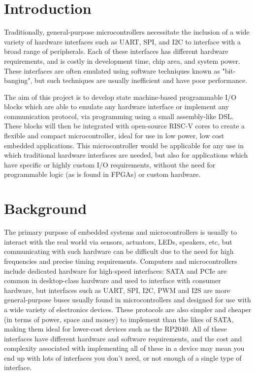 \documentclass[a4paper,fleqn,12pt]{article}
\begin{document}


\pagestyle{plain}

\section{Introduction}
Traditionally, general-purpose microcontrollers necessitate the inclusion of a wide variety of hardware interfaces such as UART, SPI, and I2C to interface with a broad range of peripherals. Each of these interfaces has different hardware requirements, and is costly in development time, chip area, and system power. These interfaces are often emulated using software techniques known as "bit-banging", but such techniques are usually inefficient and have poor performance.

The aim of this project is to develop state machine-based programmable I/O blocks which are able to emulate any hardware interface or implement any communication protocol, via programming using a small assembly-like DSL. These blocks will then be integrated with open-source RISC-V cores to create a flexible and compact microcontroller, ideal for use in low power, low cost embedded applications. This microcontroller would be applicable for any use in which traditional hardware interfaces are needed, but also for applications which have specific or highly custom I/O requirements, without the need for programmable logic (as is found in FPGAs) or custom hardware.

\section{Background}

The primary purpose of embedded systems and microcontrollers is usually to interact with the real world via sensors, actuators, LEDs, speakers, etc, but communicating with such hardware can be difficult due to the need for high frequencies and precise timing requirements. Computers and microcontrollers include dedicated hardware for high-speed interfaces: SATA and PCIe are common in desktop-class hardware and used to interface with consumer hardware, but interfaces such as UART, SPI, I2C, PWM and I2S are more general-purpose buses usually found in microcontrollers and designed for use with a wide variety of electronics devices. These protocols are also simpler and cheaper (in terms of power, space and money) to implement than the likes of SATA, making them ideal for lower-cost devices such as the RP2040. All of these interfaces have different hardware and software requirements, and the cost and complexity associated with implementing all of these in a device may mean you end up with lots of interfaces you don't need, or not enough of a single type of interface.
\end{document}

